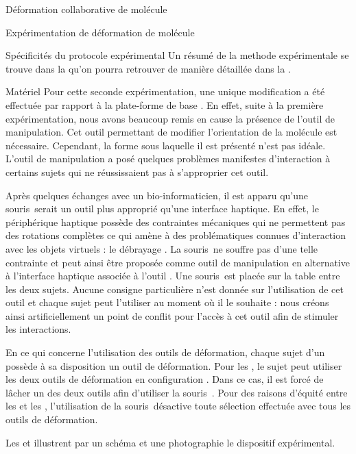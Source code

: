 \documentclass[myfrancais]{mythesis}
\begin{document}
\begin{mychapter}{Déformation collaborative de molécule}
\begin{mysection}{Expérimentation de déformation de molécule}
\begin{mysubsection}{Spécificités du protocole expérimental}
				Un résumé de la methode expérimentale se trouve dans la  qu'on pourra retrouver de manière détaillée dans la .
				\begin{mysubsubsection}[sss-exp2-Materiel]{Matériel}
					Pour cette seconde expérimentation, une unique modification a été effectuée par rapport à la plate-forme de base .
					En effet, suite à la première expérimentation, nous avons beaucoup remis en cause la présence de l'outil de manipulation.
					Cet outil permettant de modifier l'orientation de la molécule est nécessaire.
					Cependant, la forme sous laquelle il est présenté n'est pas idéale.
					L'outil de manipulation  a posé quelques problèmes manifestes d'interaction à certains sujets qui ne réussissaient pas à s'approprier cet outil.

					Après quelques échanges avec un bio-informaticien, il est apparu qu'une souris~\myThreeD serait un outil plus approprié qu'une interface haptique.
					En effet, le périphérique haptique possède des contraintes mécaniques qui ne permettent pas des rotations complètes ce qui amène à des problématiques connues d'interaction avec les objets virtuels : le débrayage .
					La souris~\myThreeD ne souffre pas d'une telle contrainte et peut ainsi être proposée comme outil de manipulation en alternative à l'interface haptique associée à l'outil .
					Une souris~\myThreeD \mySpaceNavigator est placée sur la table entre les deux sujets.
					Aucune consigne particulière n'est donnée sur l'utilisation de cet outil et chaque sujet peut l'utiliser au moment où il le souhaite : nous créons ainsi artificiellement un point de conflit pour l'accès à cet outil afin de stimuler les interactions.

					En ce qui concerne l'utilisation des outils de déformation, chaque sujet d'un  possède à sa disposition un outil de déformation.
					Pour les , le sujet peut utiliser les deux outils de déformation en configuration .
					Dans ce cas, il est forcé de lâcher un des deux outils afin d'utiliser la souris~\myThreeD.
					Pour des raisons d'équité entre les  et les , l'utilisation de la souris~\myThreeD désactive toute sélection effectuée avec tous les outils de déformation.

					Les  et  illustrent par un schéma et une photographie le dispositif expérimental.


\end{mysubsubsection}
\end{mysubsection}
\end{mysection}
\end{mychapter}
\end{document}
